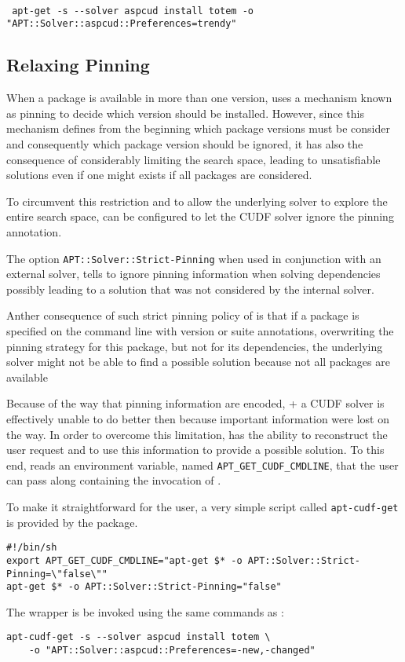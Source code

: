 \begin{verbatim}

 apt-get -s --solver aspcud install totem -o "APT::Solver::aspcud::Preferences=trendy"

\end{verbatim}


\subsection{Relaxing Pinning}

When a package is available in more than one version, \aptget uses a mechanism
known as pinning to decide which version should be installed. However,
since this mechanism defines from the beginning which package versions
must be consider and consequently which package version should be
ignored, it has also the consequence of considerably limiting the
search space, leading to unsatisfiable solutions even if one might
exists if all packages are considered.

To circumvent this restriction and to allow the underlying solver to
explore the entire search space, \aptget can be configured to let the
CUDF solver ignore the pinning annotation.

The option \texttt{APT::Solver::Strict-Pinning} when used in
conjunction with an external solver, tells \aptget to ignore pinning
information when solving dependencies possibly leading to a solution
that was not considered by the \aptget internal solver.

Anther consequence of such strict pinning policy of \aptget is that
if a package is specified on the command line with version or suite
annotations, overwriting the pinning strategy for this package, but
not for its dependencies, the underlying solver might not be able to
find a possible solution because not all packages are available 

Because of the way that pinning information are encoded, \aptcudf + a
CUDF solver is effectively unable to do better then \aptget because
important information were lost on the way.
In order to overcome this limitation, \aptcudf has the ability to 
reconstruct the user request and to use this information to provide a
possible solution. To this end, \aptcudf reads an environment variable,
named \texttt{APT\_GET\_CUDF\_CMDLINE}, that the user can pass along
containing the invocation of \aptget.

To make it straightforward for the user, a very simple script called
\texttt{apt-cudf-get} is provided by the \aptcudf package.

\begin{verbatim}
#!/bin/sh
export APT_GET_CUDF_CMDLINE="apt-get $* -o APT::Solver::Strict-Pinning=\"false\""
apt-get $* -o APT::Solver::Strict-Pinning="false"
\end{verbatim}

The wrapper is be invoked using the same commands as \aptget :

\begin{verbatim}
apt-cudf-get -s --solver aspcud install totem \
    -o "APT::Solver::aspcud::Preferences=-new,-changed"
\end{verbatim}
